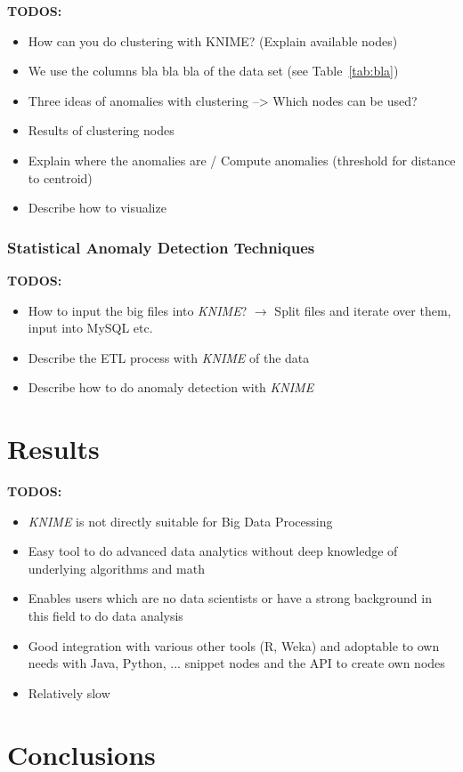 \documentclass{dima}
\begin{document}
\textbf{TODOS:}
\begin{itemize}
\item How can you do clustering with KNIME? (Explain available nodes)
\item We use the columns bla bla bla of the data set (see Table~\ref{tab:bla})
\item Three ideas of anomalies with clustering --> Which nodes can be used?
\item Results of clustering nodes
\item Explain where the anomalies are / Compute anomalies (threshold for distance to centroid)
\item Describe how to visualize 
\end{itemize}

\subsubsection{Statistical Anomaly Detection Techniques}

\textbf{TODOS:}
\begin{itemize}
\item How to input the big files into \textit{KNIME}? $\rightarrow$ Split files and iterate over them, input into MySQL etc.
\item Describe the ETL process with \textit{KNIME} of the data
\item Describe how to do anomaly detection with \textit{KNIME}
\end{itemize}

\section{Results}
\textbf{TODOS:}
\begin{itemize}
\item \textit{KNIME} is not directly suitable for Big Data Processing
\item Easy tool to do advanced data analytics without deep knowledge of underlying algorithms and math
\item Enables users which are no data scientists or have a strong background in this field to do data analysis
\item Good integration with various other tools (R, Weka) and adoptable to own needs with Java, Python, ... snippet nodes and the API to create own nodes
\item Relatively slow
\end{itemize}


\section{Conclusions}



\end{document}
